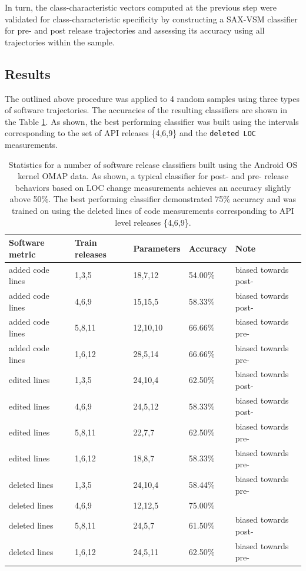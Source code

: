 In turn, the class-characteristic vectors computed at the previous step were validated for class-characteristic specificity by constructing a SAX-VSM classifier for pre- and post release trajectories and assessing its accuracy using all trajectories within the sample.


\subsection{Results}
The outlined above procedure was applied to 4 random samples using three types of software trajectories. The accuracies of the resulting classifiers are shown in the Table  \ref{android_accuracy}. As shown, the best performing classifier was built using the intervals corresponding to the set of API releases \{4,6,9\} and the \texttt{deleted LOC} measurements.

\begin{table}
\begin{tabularx}{\linewidth}{l X X X l}
\hline
Software metric & Train releases  & Parameters      & Accuracy        & Note\\
\hline
added code lines &       1,3,5 &  18,7,12& 54.00\% & biased towards post-\\
added code lines &        4,6,9 &  15,15,5 &58.33\% & biased towards post-\\
added code lines &      5,8,11 & 12,10,10 &       66.66\% & biased towards pre-\\
added code lines &       1,6,12 & 28,5,14& 66.66\% & biased towards pre-\\
edited lines &   1,3,5  & 24,10,4& 62.50\%& biased towards post-\\
edited lines &   4,6,9  & 24,5,12& 58.33\% & biased towards post-\\
edited lines &   5,8,11&  22,7,7 & 62.50\%  &biased towards pre-\\
edited lines &   1,6,12 & 18,8,7 & 58.33\% & biased towards pre-\\
deleted lines &  1,3,5  & 24,10,4& 58.44\% & biased towards pre-\\
deleted lines &  4,6,9  & 12,12,5 &75.00\%  & \\
deleted lines &  5,8,11&  24,5,7 & 61.50\% & biased towards post-\\
deleted lines &  1,6,12 & 24,5,11 &62.50\% & biased towards pre-\\
\hline
\end{tabularx}
\caption{Statistics for a number of software release classifiers built using the Android OS kernel OMAP data. As shown, a typical classifier for post- and pre- release behaviors based on LOC change measurements achieves an accuracy slightly above 50\%. The best performing classifier demonstrated 75\% accuracy and was trained on using the deleted lines of code measurements corresponding to API level releases \{4,6,9\}.}
\label{android_accuracy}
\end{table}

